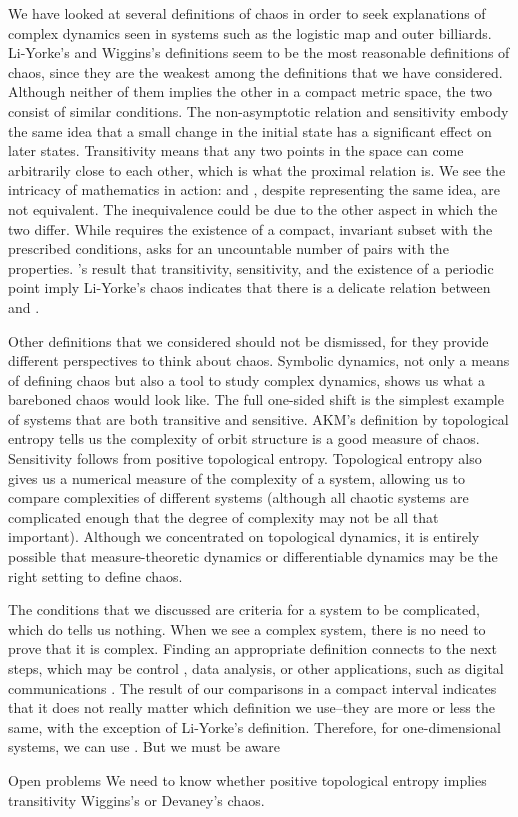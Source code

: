 \documentclass[10pt,twoside,draft]{book}
\begin{document}
We have looked at several definitions of chaos in order to seek explanations of complex dynamics seen in systems such as the logistic map and outer billiards.
Li-Yorke's and Wiggins's definitions seem to be the most reasonable definitions of chaos, since they are the weakest among the definitions that we have considered.
Although neither of them implies the other in a compact metric space, the two consist of similar conditions.
The non-asymptotic relation and sensitivity embody the same idea that a small change in the initial state has a significant effect on later states.
Transitivity means that any two points in the space can come arbitrarily close to each other, which is what the proximal relation is.
We see the intricacy of mathematics in action: \wig and \liy, despite representing the same idea, are not equivalent.
The inequivalence could be due to the other aspect in which the two differ.
While \wig requires the existence of a compact, invariant subset with the prescribed conditions, \liy asks for an uncountable number of pairs with the properties. 
\citet{mai}'s result that transitivity, sensitivity, and the existence of a periodic point imply Li-Yorke's chaos indicates that there is a delicate relation between \liy and \wig.


Other definitions that we considered should not be dismissed, for they provide different perspectives to think about chaos.
Symbolic dynamics, not only a means of defining chaos but also a tool to study complex dynamics, shows us what a bareboned chaos would look like.
The full one-sided shift is the simplest example of systems that are both transitive and sensitive.
AKM's definition by topological entropy tells us the complexity of orbit structure is a good measure of chaos.
Sensitivity follows from positive topological entropy.
Topological entropy also gives us a numerical measure of the complexity of a system, allowing us to compare complexities of different systems (although all chaotic systems are complicated enough that the degree of complexity may not be all that important).
Although we concentrated on topological dynamics, it is entirely possible that measure-theoretic dynamics or differentiable dynamics may be the right setting to define chaos.

The conditions that we discussed are criteria for a system to be complicated, which do tells us nothing.
When we see a complex system, there is no need to prove that it is complex.
Finding an appropriate definition connects to the next steps, which may be control \citep{openproblems, chaos-frontiers}, data analysis, or other applications, such as digital communications \citep{chaos-communication}.
The result of our comparisons in a compact interval indicates that it does not really matter which definition we use--they are more or less the same, with the exception of Li-Yorke's definition.
Therefore, for one-dimensional systems, we can use .
But we must be aware

Open problems
We need to know whether positive topological entropy implies transitivity  Wiggins's or Devaney's chaos.



\end{document}
